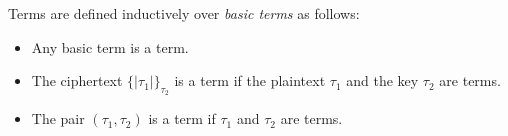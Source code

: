 \documentclass[12pt]{article}
\newcommand{\enc}[2]{\{|#1|\}_{#2}}
\newcommand{\pair}[2]{(#1, #2)}
\begin{document}
Terms are defined inductively over \emph{basic terms} as follows:

\begin{itemize}
\item Any basic term is a term.
\item The ciphertext $\enc{\tau_1}{\tau_2}$ is a term if the plaintext
  $\tau_1$ and the key $\tau_2$ are terms.
\item The pair $\pair{\tau_1}{\tau_2}$ is a term if $\tau_1$ and
  $\tau_2$ are terms.
\end{itemize}



\begin{comment}
	\subsection{Strand Spaces}

			A term $t$ is an \emph{ingredient} of another term $u$ if $u$ can
			be constructed from $t$ by repeatedly pairing with arbitrary terms
			and encrypting with arbitrary keys. A \emph{component} of a term
			$t$ is any term that can be retrieved simply by applying repeated
			unpairing operations to $t$ and is not a pair itself.

			A \emph{nonce} is a uniquely-originating basic term. A term $t$
			\emph{originates} on a node $n$ of a strand $s$ if $n$ is a
			sending node, $t$ is an ingredient of the message of $n$, and
			$t$ is not an ingredient of any previous node on $s$. A term is
			\emph{uniquely originating} if it originates on only one
			strand. A term is non-originating if it does not appear in any
			strand.

			If a regular participant generates a random fresh nonce, it
			will be assumed uniquely-originating because of the extreme
			unlikelihood of any other participant generating and
			originating the same value.

			Similarly, non-origination is helpful in describing private
			asymmetric keys that should never be sent as part of a message.

		\subsubsection{The Adversary}

			An adversary is included in the strand space
                        formalism to represent a worst-case situation,
                        where an attacker may control every point of
                        communication between regular participants.
                        The actions of the adversary are represented
                        by \emph{adversary strands}. Recall that
                        adversary strands are not bound by the rules
                        defined by the protocol; they manipulate
                        messages being sent and received by
                        non-adversarial strands.


\end{comment}
\end{document}
